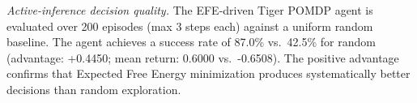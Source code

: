\textit{Active-inference decision quality.} The EFE-driven Tiger POMDP agent is evaluated over 200 episodes (max 3 steps each) against a uniform random baseline. The agent achieves a success rate of 87.0\% vs.\ 42.5\% for random (advantage: +0.4450; mean return: 0.6000 vs.\ -0.6508). 
The positive advantage confirms that Expected Free Energy minimization produces systematically better decisions than random exploration.


